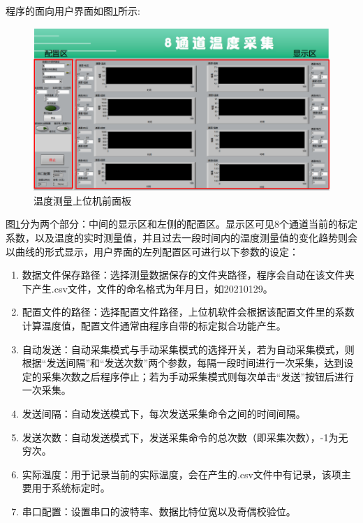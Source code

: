 程序的面向用户界面如图\ref{fig:温度测量上位机前面板}所示:
\begin{figure}[htb]
    \centering
    \includegraphics[width=14cm]{fig/3-fig/温度采集上位机前面板.png}
    \caption{温度测量上位机前面板}
    \label{fig:温度测量上位机前面板}
\end{figure}

图\ref{fig:温度测量上位机前面板}分为两个部分：中间的显示区和左侧的配置区。显示区可见8个通道当前的标定系数，以及温度的实时测量值，并且过去一段时间内的温度测量值的变化趋势则会以曲线的形式显示，用户界面的左列配置区可进行以下参数的设定：
\begin{enumerate}
    \item 数据文件保存路径：选择测量数据保存的文件夹路径，程序会自动在该文件夹下产生.csv文件，文件的命名格式为年月日，如20210129。
    \item 配置文件的路径：选择配置文件路径，上位机软件会根据该配置文件里的系数计算温度值，配置文件通常由程序自带的标定拟合功能产生。
    \item 自动发送：自动采集模式与手动采集模式的选择开关，若为自动采集模式，则根据“发送间隔”和“发送次数”两个参数，每隔一段时间进行一次采集，达到设定的采集次数之后程序停止；若为手动采集模式则每次单击“发送”按钮后进行一次采集。
    \item 发送间隔：自动发送模式下，每次发送采集命令之间的时间间隔。
    \item 发送次数：自动发送模式下，发送采集命令的总次数（即采集次数），-1为无穷次。
    \item 实际温度：用于记录当前的实际温度，会在产生的.csv文件中有记录，该项主要用于系统标定时。
    \item 串口配置：设置串口的波特率、数据比特位宽以及奇偶校验位。
  \end{enumerate}

